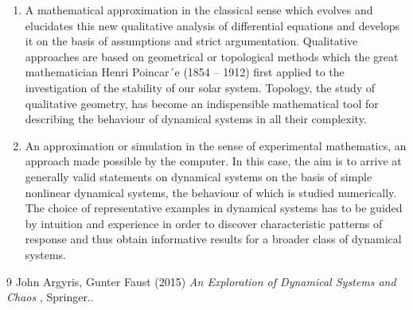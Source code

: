 \documentclass[12pt]{article}
\begin{document}
\begin{enumerate}[label=\roman*]
\item A mathematical approximation in the classical sense which evolves and elucidates
this new qualitative analysis of differential equations and develops it on
the basis of assumptions and strict argumentation. Qualitative approaches are
based on geometrical or topological methods which the great mathematician
Henri Poincar´e (1854 – 1912) first applied to the investigation of the stability
of our solar system. Topology, the study of qualitative geometry, has become
an indispensible mathematical tool for describing the behaviour of dynamical
systems in all their complexity.

\item An approximation or simulation in the sense of experimental mathematics, an
approach made possible by the computer. In this case, the aim is to arrive at
generally valid statements on dynamical systems on the basis of simple nonlinear
dynamical systems, the behaviour of which is studied numerically. The
choice of representative examples in dynamical systems has to be guided by
intuition and experience in order to discover characteristic patterns of response
and thus obtain informative results for a broader class of dynamical systems.
\end{enumerate}

\begin{thebibliography}{9}
John Argyris, Gunter Faust
 (2015) \emph{An Exploration of Dynamical
Systems and Chaos
}, Springer..
\end{thebibliography}
\end{document}
